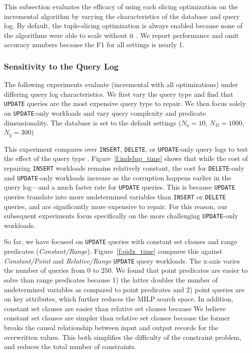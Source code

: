 This subsection evaluates the efficacy of using each slicing optimization on the incremental algorithm by varying the characteristics of the database and query log.  
By default, the tuple-slicing optimization is always enabled because none of the algorithms were able to scale without it .
We report performance and omit accuracy numbers because the F1 for all settings is nearly 1.


\subsubsection{Sensitivity to the Query Log}
\label{sec:experiments:synth}

The following experiments evaluate \sys (incremental with all optimizations) under differing query log characteristics.
We first vary the query type and find that \texttt{UPDATE} queries are the most expensive query type to repair.
We then focus solely on \texttt{UPDATE}-only workloads and vary query complexity and predicate dimensionality.
The database is set to the default settings ($N_a=10$, $N_D=1000$, $N_q=300$) 

\label{sec:indelup}
This experiment compares \qfix over \texttt{INSERT}, \texttt{DELETE}, or \texttt{UPDATE}-only query logs to test the effect of the query type . 
Figure~\ref{f:indelup_time} shows that while the cost of repairing \texttt{INSERT} workloads
remains relatively constant, the cost for \texttt{DELETE}-only and \texttt{UPDATE}-only workloads increase as 
the corruption happens earlier in the query log---and a much faster rate for \texttt{UPDATE} queries.
This is because \texttt{UPDATE} queries translate into more undetermined variables than \texttt{INSERT} or \texttt{DELETE} queries, and are significantly more expensive to repair. 
For this reason, our subsequent experiments focus specifically on the more challenging \texttt{UPDATE}-only workloads.

\smallskip
{}
So far, we have focused on \texttt{UPDATE} queries with constant set clauses and range predicates ({\it Constant/Range}).  
Figure~\ref{f:qidx_time} compares this against {\it Constant/Point} and {\it Relative/Range} \texttt{UPDATE} query workloads. 
 The x-axis varies the number of queries from $0$ to $250$.
We found that point predicates are easier to solve than range predicates because 
1) the latter doubles the number of undetermined variables as compared to point predicates and 
2) point queries are on key attributes, which further reduces the MILP search space.
In addition, constant set clauses are easier than relative set clauses because
We believe constant set clauses are simpler than relative set clauses  because the former breaks the causal relationship between input and output records for the overwritten values.
This both simplifies the difficulty of the constraint problem, and reduces the total number of constraints.


